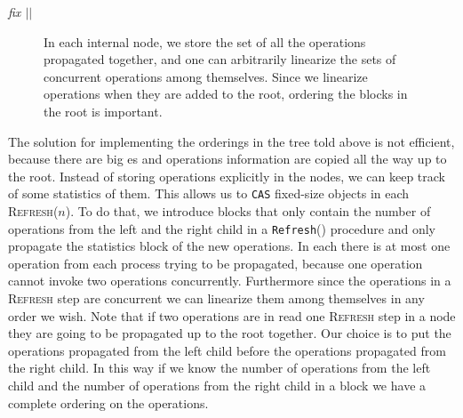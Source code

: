 \documentclass[10pt]{article}
\renewcommand{\it}[1]{\textit{#1}}
\newcommand{\nf}[1]{{\normalfont{\texttt{#1}}}}
\theoremstyle{definition}
\begin{document}
\it{fix $||$}
\begin{figure}[h]
\begin{center}
\caption{\label{fig::set} In each internal node, we store the set of all the operations propagated together, and one can arbitrarily linearize the sets of concurrent operations among themselves. Since we linearize operations when they are added to the root, ordering the blocks in the root is important.}
\end{center}
\end{figure}

The solution for  implementing the orderings in the tree told above is not efficient, because there are big \nf{CAS}es and operations information are copied all the way up to the root.
Instead of storing operations explicitly in the nodes, we can keep track of some statistics of them. This allows us to \texttt{CAS} fixed-size objects in each \textsc{Refresh}($n$). To do that, we introduce blocks that only contain the number of operations from the left and the right child in a \texttt{Refresh}() procedure and only propagate the statistics block of the new operations. In each \nf{Refresh} there is at most one operation from each process trying to be propagated, because one operation cannot invoke two operations concurrently. Furthermore since the operations in a \textsc{Refresh} step are concurrent we can linearize them  among themselves in any order we wish. Note that if two operations are in read one \textsc{Refresh} step in a node they are going to be propagated up to the root together. Our choice is to put the operations propagated from the left child before the operations propagated from the right child. In this way if we know the number of operations from the left child and the number of operations from the right child in a block  we have a complete ordering on the operations.
\end{document}
